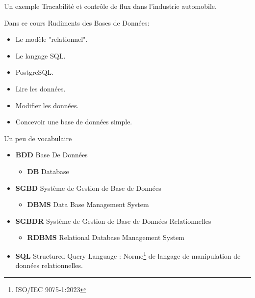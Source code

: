 \documentclass[xetex,dvipsnames]{beamer}
\begin{document}
\begin{frame}{Un exemple}
Tracabilité et contrôle de flux dans l'industrie automobile.
\end{frame}

\begin{frame}{Dans ce cours}
Rudiments des Bases de Données:
\begin{itemize}
	\item Le modèle "relationnel".
	\item Le langage SQL.
	\item PostgreSQL.
	\item Lire les données.
	\item Modifier les données.
	\item Concevoir une base de données simple.
\end{itemize}
\end{frame}



\begin{frame}{Un peu de vocabulaire}
	\begin{itemize}
		\item \textbf{BDD} Base De Données
		\begin{itemize} \footnotesize \item \textbf{DB} Database \end{itemize}
	\end{itemize}
	\vspace{1em}
	\begin{itemize}
		\item \textbf{SGBD} Système de Gestion de Base de Données 
		\begin{itemize} \footnotesize \item \textbf{DBMS} Data Base Management System \end{itemize}
	\end{itemize}
	\vspace{1em}
	\begin{itemize}
			\item \textbf{SGBDR} Système de Gestion de Base de Données Relationnelles
			\begin{itemize} \footnotesize \item \textbf{RDBMS} Relational Database Management System  \end{itemize}
	\end{itemize}
	\vspace{1em}
	
	\begin{itemize}
		\item \textbf{SQL} Structured Query Language : Norme\footnote{{\scriptsize ISO/IEC 9075-1:2023}} de langage de manipulation de données relationnelles.
	\end{itemize}
\end{frame}
\end{document}
